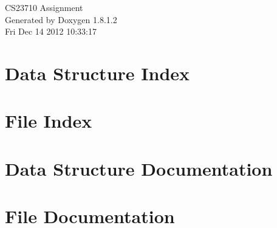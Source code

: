 \documentclass{book}
\begin{document}
\hypersetup{pageanchor=false,citecolor=blue}
\begin{titlepage}
\vspace*{7cm}
\begin{center}
{\Large C\-S23710 Assignment }\\
\vspace*{1cm}
{\large Generated by Doxygen 1.8.1.2}\\
\vspace*{0.5cm}
{\small Fri Dec 14 2012 10:33:17}\\
\end{center}
\end{titlepage}
\clearemptydoublepage
{}
\tableofcontents
\clearemptydoublepage
{}
\hypersetup{pageanchor=true,citecolor=blue}
\chapter{Data Structure Index}

\chapter{File Index}

\chapter{Data Structure Documentation}












\chapter{File Documentation}


















\printindex
\end{document}
